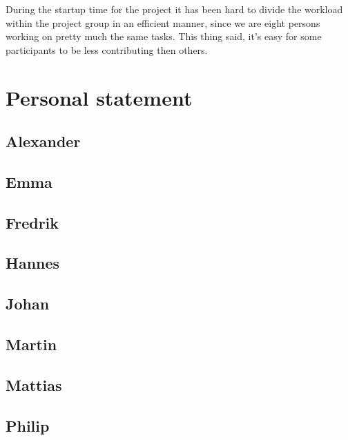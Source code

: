 \documentclass[a4paper]{article}
\begin{document}
 	During the startup time for the project it has been hard to divide the workload within the project group in an efficient manner, since we are eight persons working on pretty much the same tasks. This thing said, it's easy for some participants to be less contributing then others.


  \section{Personal statement}
  
  \subsection{Alexander}
  \subsection{Emma}
  \subsection{Fredrik}
  \subsection{Hannes}
  \subsection{Johan}
  \subsection{Martin}
  \subsection{Mattias}
  \subsection{Philip}
\end{document}

